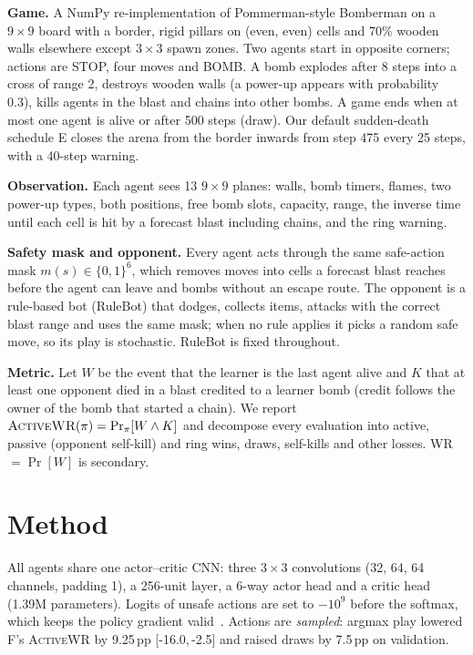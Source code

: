 \documentclass[runningheads]{llncs}
\newcommand{\awr}{\textsc{ActiveWR}}
\newcommand{\pp}{\,pp}
\newcommand{\ci}[2]{[#1,\,#2]}
\begin{document}
\textbf{Game.} A NumPy re-implementation of Pommerman-style Bomberman on a $9\times9$ board with a border, rigid pillars on (even, even) cells and 70\% wooden walls elsewhere except $3\times3$ spawn zones. Two agents start in opposite corners; actions are STOP, four moves and BOMB. A bomb explodes after 8 steps into a cross of range 2, destroys wooden walls (a power-up appears with probability 0.3), kills agents in the blast and chains into other bombs. A game ends when at most one agent is alive or after 500 steps (draw). Our default sudden-death schedule E closes the arena from the border inwards from step 475 every 25 steps, with a 40-step warning.

\textbf{Observation.} Each agent sees 13 $9\times9$ planes: walls, bomb timers, flames, two power-up types, both positions, free bomb slots, capacity, range, the inverse time until each cell is hit by a forecast blast including chains, and the ring warning.

\textbf{Safety mask and opponent.} Every agent acts through the same safe-action mask $m(s)\in\{0,1\}^6$, which removes moves into cells a forecast blast reaches before the agent can leave and bombs without an escape route. The opponent is a rule-based bot (RuleBot) that dodges, collects items, attacks with the correct blast range and uses the same mask; when no rule applies it picks a random safe move, so its play is stochastic. RuleBot is fixed throughout.

\textbf{Metric.} Let $W$ be the event that the learner is the last agent alive and $K$ that at least one opponent died in a blast credited to a learner bomb (credit follows the owner of the bomb that started a chain). We report $\awr{}(\pi)=\Pr_{\pi}[W\wedge K]$ and decompose every evaluation into active, passive (opponent self-kill) and ring wins, draws, self-kills and other losses. WR $=\Pr[W]$ is secondary.

\section{Method}

All agents share one actor--critic CNN: three $3\times3$ convolutions (32, 64, 64 channels, padding 1), a 256-unit layer, a 6-way actor head and a critic head (1.39M parameters). Logits of unsafe actions are set to $-10^9$ before the softmax, which keeps the policy gradient valid~\cite{huang2022masking}. Actions are \emph{sampled}: argmax play lowered F's \awr{} by 9.25\pp{} \ci{-16.0}{-2.5} and raised draws by 7.5\pp{} on validation.
\end{document}
